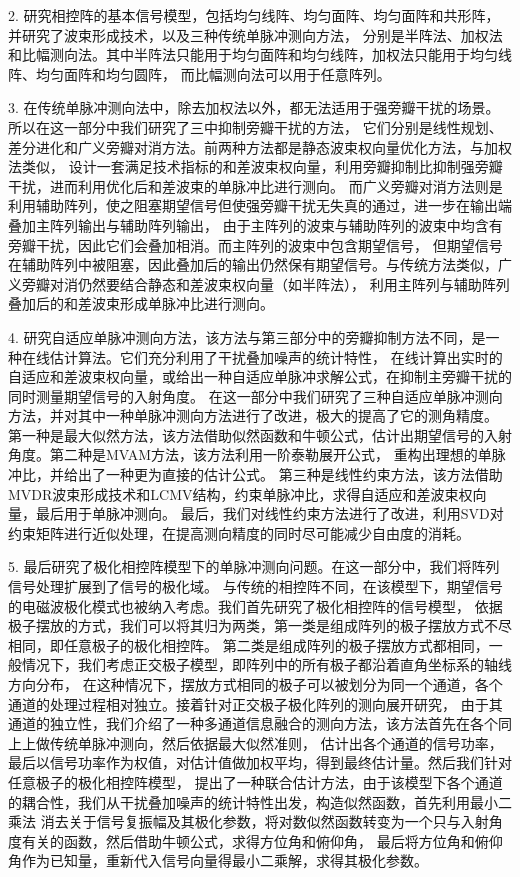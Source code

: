 \documentclass[master]{thesis-uestc}
\begin{document}
2. 研究相控阵的基本信号模型，包括均匀线阵、均匀面阵、均匀面阵和共形阵，并研究了波束形成技术，以及三种传统单脉冲测向方法，
分别是半阵法、加权法和比幅测向法。其中半阵法只能用于均匀面阵和均匀线阵，加权法只能用于均匀线阵、均匀面阵和均匀圆阵，
而比幅测向法可以用于任意阵列。

3. 在传统单脉冲测向法中，除去加权法以外，都无法适用于强旁瓣干扰的场景。所以在这一部分中我们研究了三中抑制旁瓣干扰的方法，
它们分别是线性规划、差分进化和广义旁瓣对消方法。前两种方法都是静态波束权向量优化方法，与加权法类似，
设计一套满足技术指标的和差波束权向量，利用旁瓣抑制比抑制强旁瓣干扰，进而利用优化后和差波束的单脉冲比进行测向。
而广义旁瓣对消方法则是利用辅助阵列，使之阻塞期望信号但使强旁瓣干扰无失真的通过，进一步在输出端叠加主阵列输出与辅助阵列输出，
由于主阵列的波束与辅助阵列的波束中均含有旁瓣干扰，因此它们会叠加相消。而主阵列的波束中包含期望信号，
但期望信号在辅助阵列中被阻塞，因此叠加后的输出仍然保有期望信号。与传统方法类似，广义旁瓣对消仍然要结合静态和差波束权向量（如半阵法），
利用主阵列与辅助阵列叠加后的和差波束形成单脉冲比进行测向。

4. 研究自适应单脉冲测向方法，该方法与第三部分中的旁瓣抑制方法不同，是一种在线估计算法。它们充分利用了干扰叠加噪声的统计特性，
在线计算出实时的自适应和差波束权向量，或给出一种自适应单脉冲求解公式，在抑制主旁瓣干扰的同时测量期望信号的入射角度。
在这一部分中我们研究了三种自适应单脉冲测向方法，并对其中一种单脉冲测向方法进行了改进，极大的提高了它的测角精度。
第一种是最大似然方法，该方法借助似然函数和牛顿公式，估计出期望信号的入射角度。第二种是MVAM方法，该方法利用一阶泰勒展开公式，
重构出理想的单脉冲比，并给出了一种更为直接的估计公式。
第三种是线性约束方法，该方法借助MVDR波束形成技术和LCMV结构，约束单脉冲比，求得自适应和差波束权向量，最后用于单脉冲测向。
最后，我们对线性约束方法进行了改进，利用SVD对约束矩阵进行近似处理，在提高测向精度的同时尽可能减少自由度的消耗。

5. 最后研究了极化相控阵模型下的单脉冲测向问题。在这一部分中，我们将阵列信号处理扩展到了信号的极化域。
与传统的相控阵不同，在该模型下，期望信号的电磁波极化模式也被纳入考虑。我们首先研究了极化相控阵的信号模型，
依据极子摆放的方式，我们可以将其归为两类，第一类是组成阵列的极子摆放方式不尽相同，即任意极子的极化相控阵。
第二类是组成阵列的极子摆放方式都相同，一般情况下，我们考虑正交极子模型，即阵列中的所有极子都沿着直角坐标系的轴线方向分布，
在这种情况下，摆放方式相同的极子可以被划分为同一个通道，各个通道的处理过程相对独立。接着针对正交极子极化阵列的测向展开研究，
由于其通道的独立性，我们介绍了一种多通道信息融合的测向方法，该方法首先在各个同上上做传统单脉冲测向，然后依据最大似然准则，
估计出各个通道的信号功率，最后以信号功率作为权值，对估计值做加权平均，得到最终估计量。然后我们针对任意极子的极化相控阵模型，
提出了一种联合估计方法，由于该模型下各个通道的耦合性，我们从干扰叠加噪声的统计特性出发，构造似然函数，首先利用最小二乘法
消去关于信号复振幅及其极化参数，将对数似然函数转变为一个只与入射角度有关的函数，然后借助牛顿公式，求得方位角和俯仰角，
最后将方位角和俯仰角作为已知量，重新代入信号向量得最小二乘解，求得其极化参数。
\end{document}
